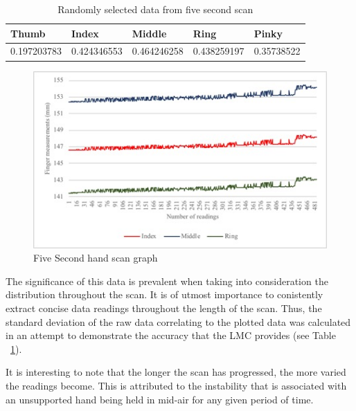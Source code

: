     \begin{table}[h!]
    \caption{Randomly selected data from five second scan}
    \centering
     \begin{tabular}{|p{} | p{}| p{}| p{}| p{}|} 
     \hline
    	\textbf{Thumb} & \textbf{Index} & \textbf{Middle} & \textbf{Ring} & \textbf{Pinky} \\ [1ex] 
     \hline\hline 
     0.197203783 & 0.424346553 &  0.464246258 & 0.438259197 & 0.35738522 \\[1ex]
     \hline 
     \end{tabular}
     \label{table: Randomly selected data from five second scan}
    \end{table}

    
    \begin{figure}[htbp!] 
    \centering    
    \includegraphics[width=1.0\textwidth]{Chapter4/Figs/FiveSecondScanGraph.jpg}
    \caption[Five Second hand scan graph]{Five Second hand scan graph}
    \label{fig:Five Second hand scan graph}
    \end{figure}
    
The significance of this data is prevalent when taking into consideration the distribution throughout the scan. It is of utmost importance to conistently extract concise data readings throughout the length of the scan. Thus, the standard deviation of the raw data correlating to the plotted data was calculated in an attempt to demonstrate the accuracy that the LMC provides (see Table ~\ref{table: Randomly selected data from five second scan}).

It is interesting to note that the longer the scan has progressed, the more varied the readings become. This is attributed to the instability that is associated with an unsupported hand being held in mid-air for any given period of time.

